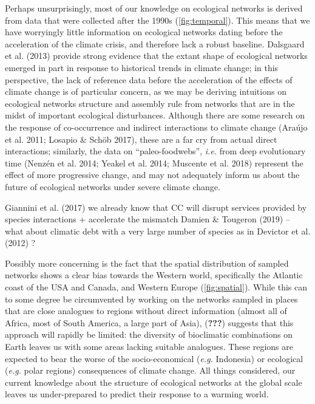 Perhaps unsurprisingly, most of our knowledge on ecological networks is
derived from data that were collected after the 1990s
(\cref{fig:temporal}). This means that we have worryingly
little information on ecological networks dating before the acceleration
of the climate crisis, and therefore lack a robust baseline. Dalsgaard
et al. (2013) provide strong evidence that the extant shape of
ecological networks emerged in part in response to historical trends in
climate change; in this perspective, the lack of reference data before
the acceleration of the effects of climate change is of particular
concern, as we may be deriving intuitions on ecological networks
structure and assembly rule from networks that are in the midst of
important ecological disturbances. Although there are some research on
the response of co-occurrence and indirect interactions to climate
change (Araújo et al. 2011; Losapio \& Schöb 2017), these are a far cry
from actual direct interactions; similarly, the data on
``paleo-foodwebs'', \emph{i.e.} from deep evolutionary time (Nenzén et
al. 2014; Yeakel et al. 2014; Muscente et al. 2018) represent the effect
of more progressive change, and may not adequately inform us about the
future of ecological networks under severe climate change.

Giannini et al. (2017) we already know that CC will disrupt services
provided by species interactions + accelerate the mismatch Damien \&
Tougeron (2019) -- what about climatic debt with a very large number of
species as in Devictor et al. (2012) ?

Possibly more concerning is the fact that the spatial distribution of
sampled networks shows a clear bias towards the Western world,
specifically the Atlantic coast of the USA and Canada, and Western
Europe (\cref{fig:spatial}). While this can to some
degree be circumvented by working on the networks sampled in places that
are close analogues to regions without direct information (almost all of
Africa, most of South America, a large part of Asia), ({\textbf{???}})
suggests that this approach will rapidly be limited: the diversity of
bioclimatic combinations on Earth leaves us with some areas lacking
suitable analogues. These regions are expected to bear the worse of the
socio-economical (\emph{e.g.} Indonesia) or ecological (\emph{e.g.}
polar regions) consequences of climate change. All things considered,
our current knowledge about the structure of ecological networks at the
global scale leaves us under-prepared to predict their response to a
warming world.

